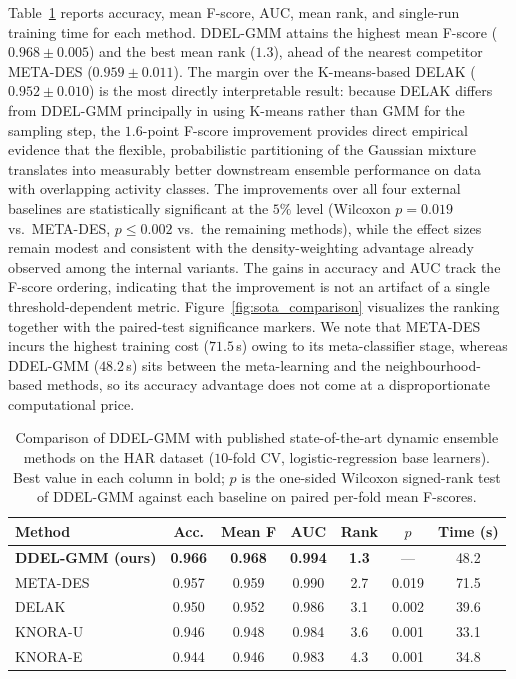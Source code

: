 \documentclass[lettersize,journal]{IEEEtran}
\newcommand{\tfourhighlight}[1]{\textcolor{tier4blue}{#1}}
\begin{document}
	\tfourhighlight{\noindent Table~\ref{tab:sota_comparison} reports accuracy, mean F-score, AUC, mean rank, and single-run training time for each method. DDEL-GMM attains the highest mean F-score ($0.968 \pm 0.005$) and the best mean rank ($1.3$), ahead of the nearest competitor META-DES ($0.959 \pm 0.011$). The margin over the K-means-based DELAK ($0.952 \pm 0.010$) is the most directly interpretable result: because DELAK differs from DDEL-GMM principally in using K-means rather than GMM for the sampling step, the $1.6$-point F-score improvement provides direct empirical evidence that the flexible, probabilistic partitioning of the Gaussian mixture translates into measurably better downstream ensemble performance on data with overlapping activity classes. The improvements over all four external baselines are statistically significant at the $5\%$ level (Wilcoxon $p = 0.019$ vs.\ META-DES, $p \leq 0.002$ vs.\ the remaining methods), while the effect sizes remain modest and consistent with the density-weighting advantage already observed among the internal variants. The gains in accuracy and AUC track the F-score ordering, indicating that the improvement is not an artifact of a single threshold-dependent metric. Figure~\ref{fig:sota_comparison} visualizes the ranking together with the paired-test significance markers. We note that META-DES incurs the highest training cost ($71.5$\,s) owing to its meta-classifier stage, whereas DDEL-GMM ($48.2$\,s) sits between the meta-learning and the neighbourhood-based methods, so its accuracy advantage does not come at a disproportionate computational price.}
	
	\begin{table}[H]
		\begin{center}
			\caption{Comparison of DDEL-GMM with published state-of-the-art dynamic ensemble methods on the HAR dataset ($10$-fold CV, logistic-regression base learners). Best value in each column in bold; $p$ is the one-sided Wilcoxon signed-rank test of DDEL-GMM against each baseline on paired per-fold mean F-scores.}
			\label{tab:sota_comparison}
			\setlength{\tabcolsep}{3pt}
			\begin{tabular}{|l|c|c|c|c|c|c|}
				\hline
				\textbf{Method} & \textbf{Acc.} & \textbf{Mean F} & \textbf{AUC} & \textbf{Rank} & \textbf{$p$} & \textbf{Time (s)} \\
				\hline
				\textbf{DDEL-GMM (ours)} & \textbf{0.966} & \textbf{0.968} & \textbf{0.994} & \textbf{1.3} & --- & 48.2 \\
				\hline
				META-DES \cite{cruz_meta-oracle_2017} & 0.957 & 0.959 & 0.990 & 2.7 & 0.019 & 71.5 \\
				\hline
				DELAK \cite{guo_dynamic_2021} & 0.950 & 0.952 & 0.986 & 3.1 & 0.002 & 39.6 \\
				\hline
				KNORA-U \cite{ko_dynamic_2008} & 0.946 & 0.948 & 0.984 & 3.6 & 0.001 & 33.1 \\
				\hline
				KNORA-E \cite{ko_dynamic_2008} & 0.944 & 0.946 & 0.983 & 4.3 & 0.001 & 34.8 \\
				\hline
			\end{tabular}
		\end{center}
	\end{table}
	
\end{document}
